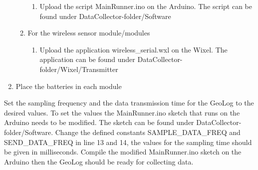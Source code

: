 \begin{enumerate}
\begin{enumerate}
\begin{enumerate}
		\item Upload the script MainRunner.ino on the Arduino. The script can be found under DataCollector-folder/Software
		\end{enumerate}
	\item For the wireless sensor module/modules
		\begin{enumerate}
		\item Upload the application wireless\_serial.wxl on the Wixel. The application can be found under DataCollector-folder/Wixel/Transmitter
		\end{enumerate} 
	\end{enumerate}
\item Place the batteries in each module
\end{enumerate}

Set the sampling frequency and the data transmission time for the GeoLog to the desired values. To set the values the MainRunner.ino sketch that runs on the Arduino needs to be modified. The sketch can be found under DataCollector-folder/Software. Change the defined constants SAMPLE\_DATA\_FREQ and SEND\_DATA\_FREQ in line 13 and 14, the values for the sampling time should be given in milliseconds. Compile the modified MainRunner.ino sketch on the Arduino then the GeoLog should be ready for collecting data.\\

